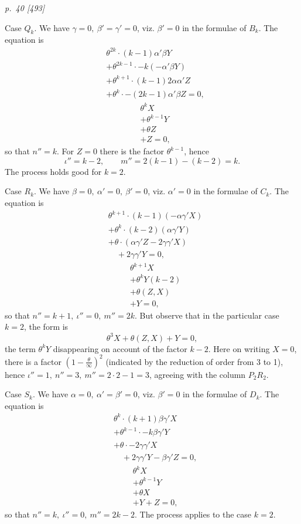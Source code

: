 ﻿\documentclass[11pt,a4paper]{article}
\theoremstyle{plain}
\theoremstyle{definition}
\begin{document}
\clearpage
\textit{p.~40 [493]}

Case \(Q_k\). We have \(\gamma=0,\ \beta'=\gamma'=0\), viz. \(\beta'=0\)
in the formulae of \(B_k\). The equation is
\[
\begin{aligned}
&\theta^{2k}\cdot(k-1)\alpha'\beta Y\\
&+\theta^{2k-1}\cdot-k(-\alpha'\beta Y)\\
&+\theta^{k+1}\cdot(k-1)2\alpha\alpha'Z\\
&+\theta^k\cdot-(2k-1)\alpha'\beta Z=0,
\end{aligned}
\]
\[
\begin{aligned}
&\theta^kX\\
&+\theta^{k-1}Y\\
&+\theta Z\\
&+Z=0,
\end{aligned}
\]
so that \(n''=k\). For \(Z=0\) there is the factor \(\theta^{k-1}\), hence
\[
\iota''=k-2,\qquad m''=2(k-1)-(k-2)=k.
\]
The process holds good for \(k=2\).

Case \(R_k\). We have \(\beta=0,\ \alpha'=0,\ \beta'=0\), viz.
\(\alpha'=0\) in the formulae of \(C_k\). The equation is
\[
\begin{aligned}
&\theta^{k+1}\cdot(k-1)(-\alpha\gamma'X)\\
&+\theta^k\cdot(k-2)(\alpha\gamma'Y)\\
&+\theta\cdot(\alpha\gamma'Z-2\gamma\gamma'X)\\
&\quad+2\gamma\gamma'Y=0,
\end{aligned}
\]
\[
\begin{aligned}
&\theta^{k+1}X\\
&+\theta^kY(k-2)\\
&+\theta(Z,X)\\
&+Y=0,
\end{aligned}
\]
so that \(n''=k+1,\ \iota''=0,\ m''=2k\). But observe that in the
particular case \(k=2\), the form is
\[
\theta^3X+\theta(Z,X)+Y=0,
\]
the term \(\theta^kY\) disappearing on account of the factor \(k-2\). Here
on writing \(X=0\), there is a factor
\((1-\frac{\theta}{\infty})^2\) (indicated by the reduction of order from
3 to 1), hence \(\iota''=1,\ n''=3,\ m''=2\cdot2-1=3\), agreeing with the
column \(P_2R_2\).

Case \(S_k\). We have \(\alpha=0,\ \alpha'=\beta'=0\), viz. \(\beta'=0\)
in the formulae of \(D_k\). The equation is
\[
\begin{aligned}
&\theta^k\cdot(k+1)\beta\gamma'X\\
&+\theta^{k-1}\cdot-k\beta\gamma'Y\\
&+\theta\cdot-2\gamma\gamma'X\\
&\quad+2\gamma\gamma'Y-\beta\gamma'Z=0,
\end{aligned}
\]
\[
\begin{aligned}
&\theta^kX\\
&+\theta^{k-1}Y\\
&+\theta X\\
&+Y+Z=0,
\end{aligned}
\]
so that \(n''=k,\ \iota''=0,\ m''=2k-2\). The process applies to the case
\(k=2\).
\end{document}
